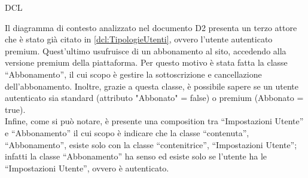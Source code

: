 \begin{listaPersonale}{DCL}
\begin{listaPersonale2}[DCL]{}
        \begin{center}
            
        \end{center}



        Il diagramma di contesto analizzato nel documento D2 presenta un terzo attore che è stato già citato in \ref{dcl:TipologieUtenti}, ovvero l'utente autenticato premium. Quest'ultimo usufruisce di un abbonamento al sito, accedendo alla versione premium della piattaforma. Per questo motivo è stata fatta la classe “Abbonamento”, il cui scopo è gestire la sottoscrizione e cancellazione dell'abbonamento. Inoltre, grazie a questa classe, è possibile sapere se un utente autenticato sia standard (attributo "Abbonato" = false) o premium (Abbonato = true). \\
        Infine, come si può notare, è presente una composition tra “Impostazioni Utente” e “Abbonamento” il cui scopo è indicare che la classe “contenuta”, “Abbonamento”, esiste solo con la classe “contenitrice”, “Impostazioni Utente”; infatti la classe “Abbonamento” ha senso ed esiste solo se l'utente ha le “Impostazioni Utente”, ovvero è autenticato.


        \begin{center}
            
        \end{center}




\end{listaPersonale2}
\end{listaPersonale}
